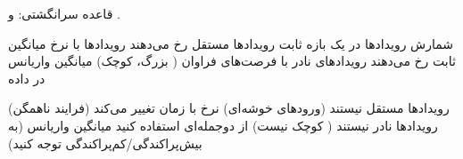 قاعده سرانگشتی:  و .


\lr{\mbox{\PSyes{}}} شمارش رویدادها در یک بازه ثابت\PSbr{}\lr{\mbox{\PSyes{}}} رویدادها مستقل رخ می‌دهند\PSbr{}\lr{\mbox{\PSyes{}}} رویدادها با نرخ میانگین ثابت رخ می‌دهند\PSbr{}\lr{\mbox{\PSyes{}}} رویدادهای نادر با فرصت‌های فراوان ( بزرگ،  کوچک)\PSbr{}\lr{\mbox{\PSyes{}}} میانگین \lr{\mbox{\ensuremath{\approx}}} واریانس در داده


\lr{\mbox{\PSno{}}} رویدادها مستقل نیستند (ورودهای خوشه‌ای)\PSbr{}\lr{\mbox{\PSno{}}} نرخ با زمان تغییر می‌کند (فرایند ناهمگن)\PSbr{}\lr{\mbox{\PSno{}}} رویدادها نادر نیستند ( کوچک نیست)  از دوجمله‌ای استفاده کنید\PSbr{}\lr{\mbox{\PSno{}}} میانگین \lr{\mbox{\ensuremath{\neq}}} واریانس (به بیش‌پراکندگی/کم‌پراکندگی توجه کنید)



